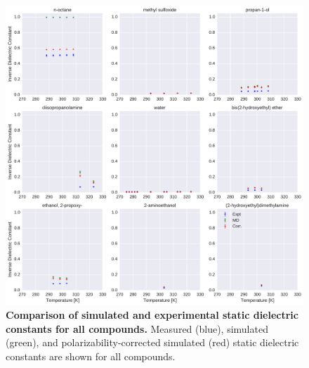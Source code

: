 \documentclass[journal=jacsat,manuscript=article]{achemso}
\begin{document}
\begin{figure}[alldielectric]

\ContinuedFloat

\includegraphics[width=\textwidth]{./figures/dielectric_versus_temperature_part1.pdf}

\caption{{\bf Comparison of simulated and experimental static dielectric constants for all compounds.}
Measured (blue), simulated (green), and polarizability-corrected simulated (red) static dielectric constants are shown for all compounds.
}

\label{figure:AllDielectrics}

\end{figure}
\end{document}
